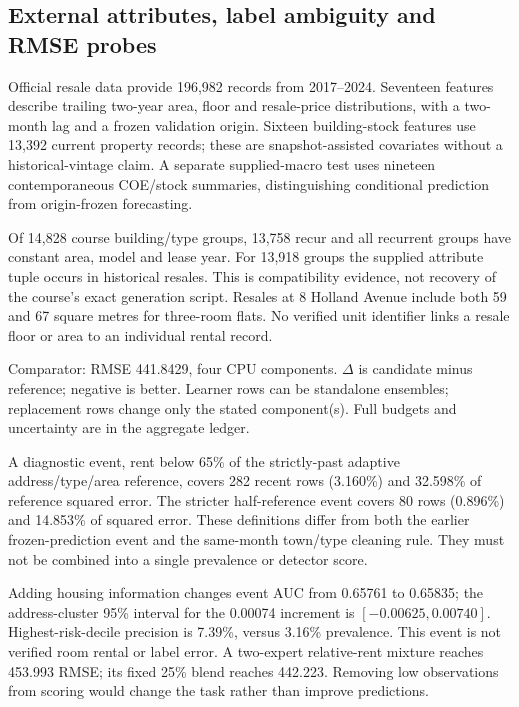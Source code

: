 \subsection{External attributes, label ambiguity and RMSE probes}
Official resale data\cite{hdb-resale} provide 196,982 records from 2017--2024. Seventeen features describe trailing two-year area, floor and resale-price distributions, with a two-month lag and a frozen validation origin. Sixteen building-stock features use 13,392 current property records\cite{hdb-property}; these are snapshot-assisted covariates without a historical-vintage claim. A separate supplied-macro test uses nineteen contemporaneous COE/stock summaries, distinguishing conditional prediction from origin-frozen forecasting.

Of 14,828 course building/type groups, 13,758 recur and all recurrent groups have constant area, model and lease year. For 13,918 groups the supplied attribute tuple occurs in historical resales. This is compatibility evidence, not recovery of the course's exact generation script. Resales at 8 Holland Avenue include both 59 and 67 square metres for three-room flats. No verified unit identifier links a resale floor or area to an individual rental record.

\begin{table}[!ht]
\caption{November CPU probes on the same recent development sample.}
\label{tab:nov-cpu}\centering\scriptsize

\par\smallskip\raggedright\footnotesize Comparator: RMSE 441.8429, four CPU components. $\Delta$ is candidate minus reference; negative is better. Learner rows can be standalone ensembles; replacement rows change only the stated component(s). Full budgets and uncertainty are in the aggregate ledger.
\end{table}

A diagnostic event, rent below 65\% of the strictly-past adaptive address/type/area reference, covers 282 recent rows (3.160\%) and 32.598\% of reference squared error. The stricter half-reference event covers 80 rows (0.896\%) and 14.853\% of squared error. These definitions differ from both the earlier frozen-prediction event and the same-month town/type cleaning rule. They must not be combined into a single prevalence or detector score.

Adding housing information changes event AUC from 0.65761 to 0.65835; the address-cluster 95\% interval for the 0.00074 increment is $[-0.00625,0.00740]$. Highest-risk-decile precision is 7.39\%, versus 3.16\% prevalence. This event is not verified room rental or label error. A two-expert relative-rent mixture reaches 453.993 RMSE; its fixed 25\% blend reaches 442.223. Removing low observations from scoring would change the task rather than improve predictions.

